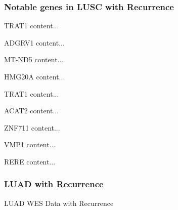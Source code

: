 \documentclass{beamer}
\begin{document}
    \begin{frame}[allowframebreaks]
        \frametitle{Notable genes in LUSC with Recurrence}

        \begin{block}{TRAT1}
            content...
        \end{block}

        \begin{block}{ADGRV1}
            content...
        \end{block}

        \begin{block}{MT-ND5}
            content...
        \end{block}

        \begin{block}{HMG20A}
            content...
        \end{block}

        \begin{block}{TRAT1}
            content...
        \end{block}

        \begin{block}{ACAT2}
            content...
        \end{block}

        \begin{block}{ZNF711}
            content...
        \end{block}

        \begin{block}{VMP1}
            content...
        \end{block}

        \begin{block}{RERE}
            content...
        \end{block}
    \end{frame}

    \begin{frame}
        \frametitle{LUAD with Recurrence}

        \begin{table}
            \caption{LUAD WES Data with Recurrence}
            \resizebox{!}{0.3 \textheight}
            {}
        \end{table}
    \end{frame}
\end{document}

